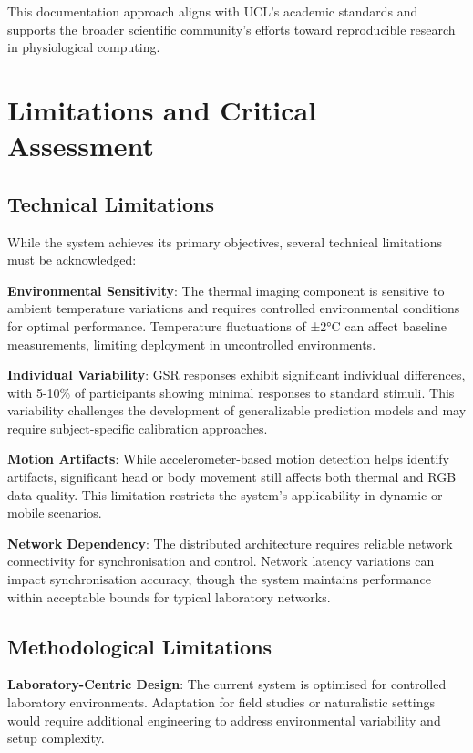 This documentation approach aligns with UCL's academic standards and supports the broader scientific community's efforts toward reproducible research in physiological computing.

\section{Limitations and Critical Assessment}

\subsection{Technical Limitations}

While the system achieves its primary objectives, several technical limitations must be acknowledged:

\textbf{Environmental Sensitivity}: The thermal imaging component is sensitive to ambient temperature variations and requires controlled environmental conditions for optimal performance. Temperature fluctuations of ±2°C can affect baseline measurements, limiting deployment in uncontrolled environments.

\textbf{Individual Variability}: GSR responses exhibit significant individual differences, with 5-10\% of participants showing minimal responses to standard stimuli. This variability challenges the development of generalizable prediction models and may require subject-specific calibration approaches.

\textbf{Motion Artifacts}: While accelerometer-based motion detection helps identify artifacts, significant head or body movement still affects both thermal and RGB data quality. This limitation restricts the system's applicability in dynamic or mobile scenarios.

\textbf{Network Dependency}: The distributed architecture requires reliable network connectivity for synchronisation and control. Network latency variations can impact synchronisation accuracy, though the system maintains performance within acceptable bounds for typical laboratory networks.

\subsection{Methodological Limitations}

\textbf{Laboratory-Centric Design}: The current system is optimised for controlled laboratory environments. Adaptation for field studies or naturalistic settings would require additional engineering to address environmental variability and setup complexity.

